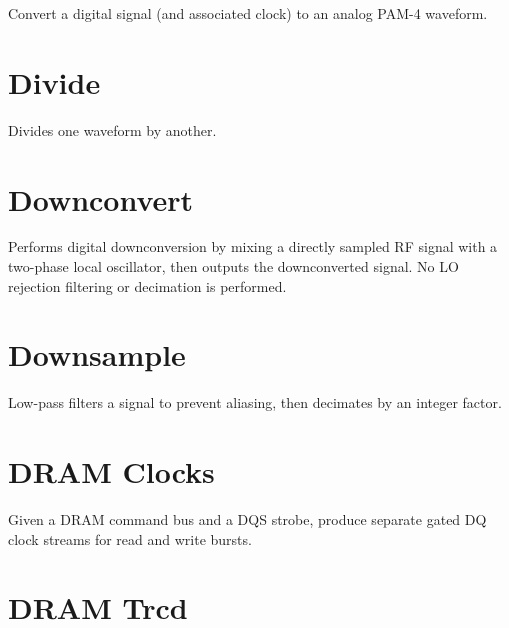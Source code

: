 Convert a digital signal (and associated clock) to an analog PAM-4 waveform.

\pagebreak
\section{Divide}

Divides one waveform by another.

\pagebreak
\section{Downconvert}

Performs digital downconversion by mixing a directly sampled RF signal with a two-phase local oscillator, then outputs
the downconverted signal. No LO rejection filtering or decimation is performed.

\pagebreak
\section{Downsample}

Low-pass filters a signal to prevent aliasing, then decimates by an integer factor.

\pagebreak
\section{DRAM Clocks}

Given a DRAM command bus and a DQS strobe, produce separate gated DQ clock streams for read and write bursts.

\pagebreak
\section{DRAM Trcd}

\pagebreak
